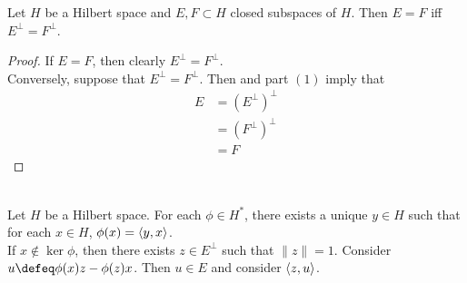\documentclass{book}
\begin{document}
\begin{ex}
	Let $H$ be a Hilbert space and $E,F \subset H$ closed subspaces of $H$. Then $E = F$ iff $E^{\perp} = F^{\perp}$.
\end{ex}

\begin{proof}
	If $E = F$, then clearly $E^{\perp} = F^{\perp}$. \\
	Conversely, suppose that $E^{\perp} = F^{\perp}$. Then  and part $(1)$ imply that
	\begin{align*}
		E
		& = (E^{\perp})^{\perp} \\
		& = (F^{\perp})^{\perp} \\
		& = F
	\end{align*}
\end{proof}

\begin{ex}  \\
	Let $H$ be a Hilbert space. For each $\phi \in H^*$, there exists a unique $y \in H$ such that for each $x \in H$, $\phi(x) = \langle y, x \rangle$. \\
	 If $x \not \in \ker \phi$, then there exists $z \in E^{\perp}$ such that $\|z\| = 1$. Consider $u \defeq \phi(x)z - \phi(z)x$. Then $u \in E$ and consider $\langle z, u \rangle$. 
\end{ex}
\end{document}
